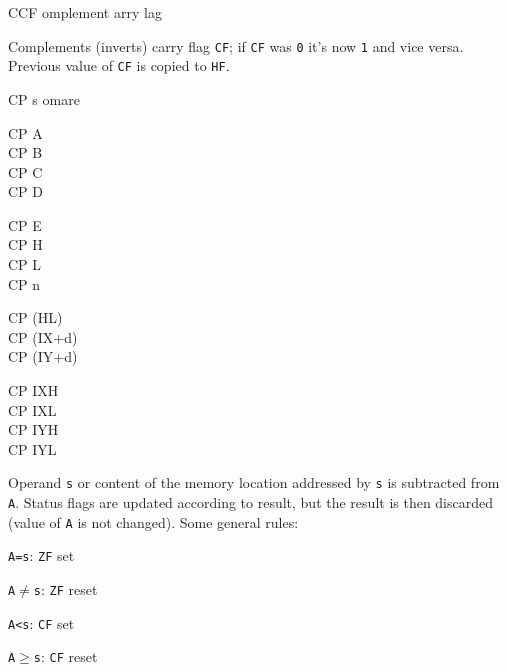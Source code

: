 \documentclass[12pt,twoside,openright,a4paper]{book}
\begin{document}
\begin{basedescript}{
	\desclabelstyle{\multilinelabel}
	\desclabelwidth{3cm}}
	\begin{DetailItem}{CCF}
		{omplement arry lag}
		{\SymCCF}

		Complements (inverts) carry flag {\tt CF}; if {\tt CF} was {\tt 0} it's now {\tt 1} and vice versa. Previous value of {\tt CF} is copied to {\tt HF}.

		\begin{DetailEffects}
			\FlagsCCF
		\end{DetailEffects}
		
		\begin{DetailTiming}
		\end{DetailTiming}

	\end{DetailItem}
	
	\pagebreak
	\label{DetailRefCP}
	\begin{DetailItem}{CP s}
		{omare}
		{}

		\begin{DetailVariants}[4]
			CP A\\
			CP B\\
			CP C\\
			CP D

			\columnbreak
			CP E\\
			CP H\\
			CP L\\
			CP n

			\columnbreak
			CP (HL)\\
			CP (IX+d)\\
			CP (IY+d)

			\columnbreak
			CP IXH\UNDOC\\
			CP IXL\UNDOC\\
			CP IYH\UNDOC\\
			CP IYL\UNDOC
		\end{DetailVariants}

		Operand {\tt s} or content of the memory location addressed by {\tt s} is subtracted from {\tt A}. Status flags are updated according to result, but the result is then discarded (value of {\tt A} is not changed). Some general rules:

		\begin{multicols}{2}
			\begin{DetailCompactList}[Signed]
				\item {\tt A=s}: {\tt ZF} set
				\item {\tt A$\neq$s}: {\tt ZF} reset
				\item {\tt A<s}: {\tt CF} set
				\item {\tt A$\geqslant$s}: {\tt CF} reset	
			\end{DetailCompactList}


\end{multicols}
\end{DetailItem}
\end{basedescript}
\end{document}
